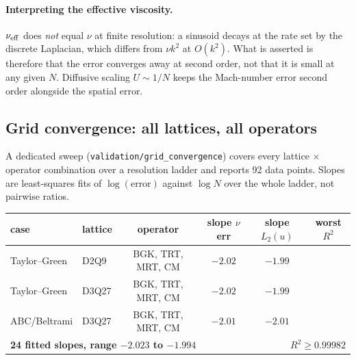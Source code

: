 \documentclass[11pt,a4paper]{article}
\newcommand{\code}[1]{\texttt{\small #1}}
\begin{document}
\paragraph{Interpreting the effective viscosity.} $\nu_{\rm eff}$ does \emph{not}
equal $\nu$ at finite resolution: a sinusoid decays at the rate set by the
discrete Laplacian, which differs from $\nu k^2$ at $O(k^2)$. What is asserted is
therefore that the error converges away at second order, not that it is small at
any given $N$. Diffusive scaling $U\sim1/N$ keeps the Mach-number error second
order alongside the spatial error.

\subsection{Grid convergence: all lattices, all operators}

A dedicated sweep (\code{validation/grid\_convergence}) covers every
lattice $\times$ operator combination over a resolution ladder and reports 92 data
points. Slopes are least-squares fits of $\log(\text{error})$ against $\log N$
over the whole ladder, not pairwise ratios.

\begin{center}\small
\begin{tabular}{llcccc}
\toprule
case & lattice & operator & slope $\nu$ err & slope $L_2(u)$ & worst $R^2$ \\
\midrule
Taylor--Green & D2Q9  & BGK, TRT, MRT, CM & $-2.02$ & $-1.99$ & \\
Taylor--Green & D3Q27 & BGK, TRT, MRT, CM & $-2.02$ & $-1.99$ & \\
ABC/Beltrami  & D3Q27 & BGK, TRT, MRT, CM & $-2.01$ & $-2.01$ & \\
\midrule
\multicolumn{4}{l}{\textbf{24 fitted slopes, range $-2.023$ to $-1.994$}}
  & \multicolumn{2}{r}{\textbf{$R^2 \geq 0.99982$}} \\
\bottomrule
\end{tabular}
\end{center}
\end{document}
